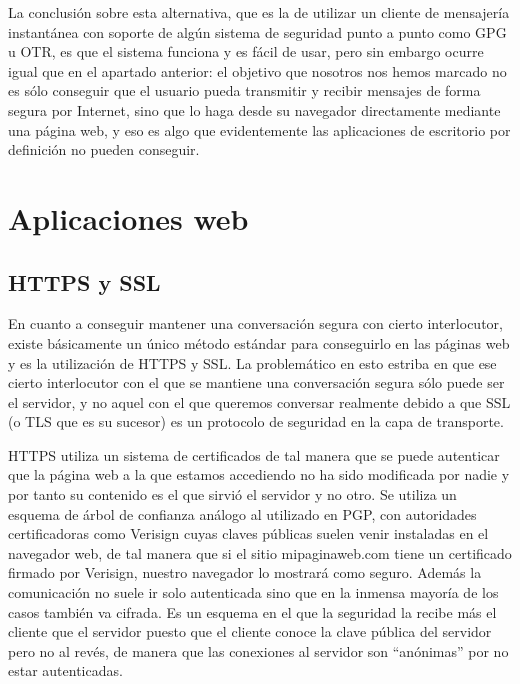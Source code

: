 La conclusión sobre esta alternativa, que es la de utilizar un cliente de mensajería instantánea con soporte de algún sistema de seguridad punto a punto como GPG u OTR, es que el sistema funciona y es fácil de usar, pero sin embargo ocurre igual que en el apartado anterior: el objetivo que nosotros nos hemos marcado no es sólo conseguir que el usuario pueda transmitir y recibir mensajes de forma segura por Internet, sino que lo haga desde su navegador directamente mediante una página web, y eso es algo que evidentemente las aplicaciones de escritorio por definición no pueden conseguir.

\section{Aplicaciones web}\label{aplicacionesweb}
\subsection{HTTPS y SSL}\label{sslweb}

En cuanto a conseguir mantener una conversación segura con cierto interlocutor, existe básicamente un único método estándar para conseguirlo en las páginas web y es la utilización de HTTPS y SSL. La problemático en esto estriba en que ese cierto interlocutor con el que se mantiene una conversación segura sólo puede ser el servidor, y no aquel con el que queremos conversar realmente debido a que SSL (o TLS que es su sucesor) es un protocolo de seguridad en la capa de transporte.

HTTPS utiliza un sistema de certificados de tal manera que se puede autenticar que la página web a la que estamos accediendo no ha sido modificada por nadie y por tanto su contenido es el que sirvió el servidor y no otro. Se utiliza un esquema de árbol de confianza análogo al utilizado en PGP, con autoridades certificadoras como Verisign cuyas claves públicas suelen venir instaladas en el navegador web, de tal manera que si el sitio mipaginaweb.com tiene un certificado firmado por Verisign, nuestro navegador lo mostrará como seguro. Además la comunicación no suele ir solo autenticada sino que en la inmensa mayoría de los casos también va cifrada. Es un esquema en el que la seguridad la recibe más el cliente que el servidor puesto que el cliente conoce la clave pública del servidor pero no al revés, de manera que las conexiones al servidor son ``anónimas'' por no estar autenticadas.

